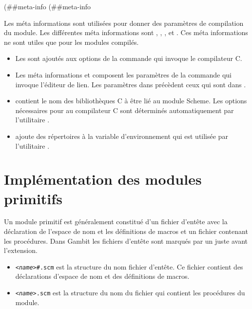 \begin{center}
  \begin{mplisting}{0.5}
(##meta-info %
(##meta-info %
\end{mplisting}
\end{center}

Les méta informations sont utilisées pour donner des paramètres de compilation
du module. Les différentes méta informations sont ,
, , 
et . Ces méta informations ne sont utiles que pour les modules
compilés.

\begin{itemize}
  \item Les  sont ajoutés aux options de la commande qui
    invoque le compilateur C.

  \item Les méta informations  et 
    composent les paramètres de la commande qui invoque l'éditeur de lien.
    Les paramètres dans  précèdent ceux
    qui sont dans .

  \item {} contient le nom des bibliothèques C à être
    lié au module Scheme. Les options nécessaires pour au compilateur
    C sont déterminés automatiquement par l'utilitaire .

  \item {} ajoute des répertoires à la variable d'environnement
     qui est utilisée par l'utilitaire .

\end{itemize}

\section{Implémentation des modules primitifs}

Un module primitif est généralement constitué d'un fichier d'entête avec la
déclaration de l'espace de nom et les définitions de macros et un fichier
contenant les procédures. Dans Gambit les fichiers d'entête sont marqués par un
\lstcode{#} juste avant l'extension.

\begin{itemize}
  \item \texttt{\textit{<name>}\#.scm} est la structure du nom fichier d'entête.
    Ce fichier contient des déclarations d'espace de nom et des
    définitions de macros.

  \item \texttt{\textit{<name>}.scm} est la structure du nom du fichier qui contient
    les procédures du module.

\end{itemize}

